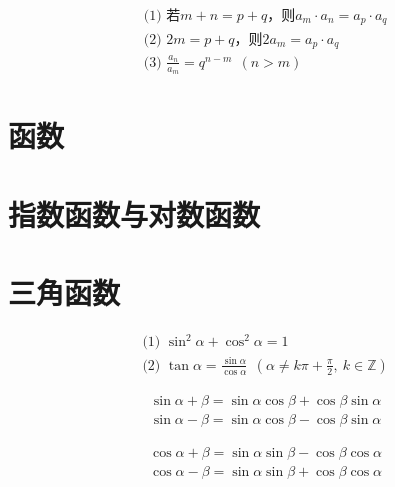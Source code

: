\documentclass[a5paper]{article}
\begin{document}

\begin{align*}
    & \text{(1) 若} m+n = p+q \text{，则} a_m \cdot a_n = a_p \cdot a_q \\
    & \text{(2)~} 2m = p+q \text{，则} 2a_m = a_p \cdot a_q \\
    & \text{(3)~} \frac{a_n}{a_m} = q^{n-m} ~~(n>m)
\end{align*}


\section{{\large \textbf{函数}}}


\section{{\large \textbf{指数函数与对数函数}}}


\section{{\large \textbf{三角函数}}}


\begin{align*}
    & \text{(1) } \sin^2{\alpha} + \cos^2{\alpha} = 1 \\
    & \text{(2) } \tan{\alpha} = \frac{\sin{\alpha}}{\cos{\alpha}} ~~(\alpha \ne k\pi+\frac{\pi}{2},~k\in{}\mathbb{Z})
\end{align*}


\begin{align*}
    & \sin{\alpha + \beta} = \sin{\alpha}\cos{\beta} + \cos{\beta}\sin{\alpha} \\
    & \sin{\alpha - \beta} = \sin{\alpha}\cos{\beta} - \cos{\beta}\sin{\alpha}
\end{align*}


\begin{align*}
    & \cos{\alpha + \beta} = \sin{\alpha}\sin{\beta} - \cos{\beta}\cos{\alpha} \\
    & \cos{\alpha - \beta} = \sin{\alpha}\sin{\beta} + \cos{\beta}\cos{\alpha}
\end{align*}
\end{document}
